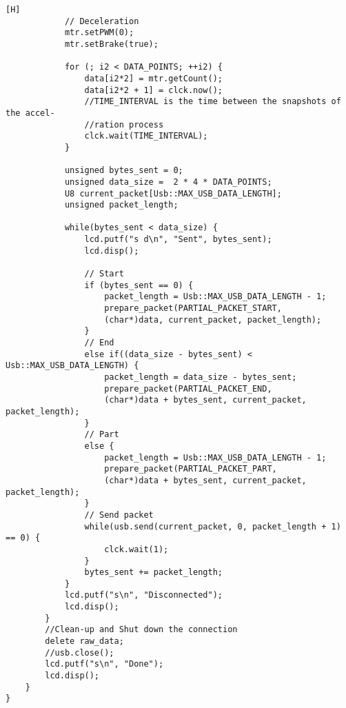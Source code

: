 \begin{lstlisting}[language=inc_cpp, caption={Speed-Timing Test software}, label=lst_speed_timing][H]
            // Deceleration
            mtr.setPWM(0);
            mtr.setBrake(true);
            
            for (; i2 < DATA_POINTS; ++i2) {
                data[i2*2] = mtr.getCount();
                data[i2*2 + 1] = clck.now();
                //TIME_INTERVAL is the time between the snapshots of the accel-
                //ration process
                clck.wait(TIME_INTERVAL);
            }
            
            unsigned bytes_sent = 0;
            unsigned data_size =  2 * 4 * DATA_POINTS;
            U8 current_packet[Usb::MAX_USB_DATA_LENGTH];
            unsigned packet_length;

            while(bytes_sent < data_size) {
                lcd.putf("s d\n", "Sent", bytes_sent);
                lcd.disp();
                
                // Start
                if (bytes_sent == 0) {
                    packet_length = Usb::MAX_USB_DATA_LENGTH - 1;
                    prepare_packet(PARTIAL_PACKET_START, 
                    (char*)data, current_packet, packet_length);
                }
                // End
                else if((data_size - bytes_sent) < Usb::MAX_USB_DATA_LENGTH) {
                    packet_length = data_size - bytes_sent;
                    prepare_packet(PARTIAL_PACKET_END, 
                    (char*)data + bytes_sent, current_packet, packet_length);
                }
                // Part
                else {
                    packet_length = Usb::MAX_USB_DATA_LENGTH - 1;
                    prepare_packet(PARTIAL_PACKET_PART, 
                    (char*)data + bytes_sent, current_packet, packet_length);
                }
                // Send packet
                while(usb.send(current_packet, 0, packet_length + 1) == 0) {
                    clck.wait(1);
                }
                bytes_sent += packet_length;
            }
            lcd.putf("s\n", "Disconnected");
            lcd.disp();
        }
        //Clean-up and Shut down the connection
        delete raw_data;
        //usb.close();
        lcd.putf("s\n", "Done");
        lcd.disp();
    }
}
\end{lstlisting}